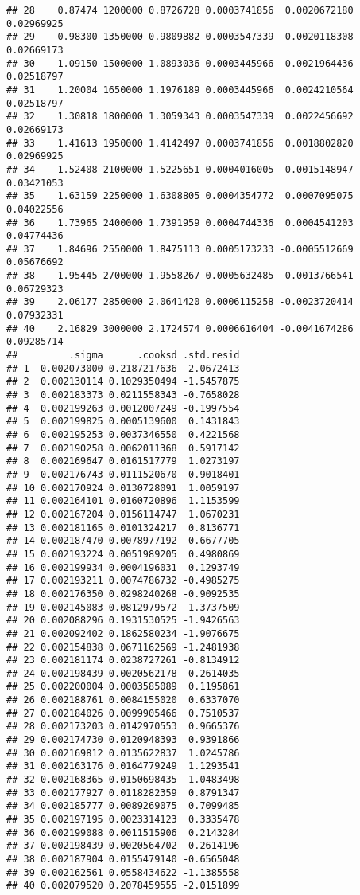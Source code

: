 \documentclass[]{book}
\theoremstyle{definition}
\theoremstyle{definition}
\theoremstyle{definition}
\theoremstyle{remark}
\begin{document}
\begin{verbatim}
## 28    0.87474 1200000 0.8726728 0.0003741856  0.0020672180 0.02969925
## 29    0.98300 1350000 0.9809882 0.0003547339  0.0020118308 0.02669173
## 30    1.09150 1500000 1.0893036 0.0003445966  0.0021964436 0.02518797
## 31    1.20004 1650000 1.1976189 0.0003445966  0.0024210564 0.02518797
## 32    1.30818 1800000 1.3059343 0.0003547339  0.0022456692 0.02669173
## 33    1.41613 1950000 1.4142497 0.0003741856  0.0018802820 0.02969925
## 34    1.52408 2100000 1.5225651 0.0004016005  0.0015148947 0.03421053
## 35    1.63159 2250000 1.6308805 0.0004354772  0.0007095075 0.04022556
## 36    1.73965 2400000 1.7391959 0.0004744336  0.0004541203 0.04774436
## 37    1.84696 2550000 1.8475113 0.0005173233 -0.0005512669 0.05676692
## 38    1.95445 2700000 1.9558267 0.0005632485 -0.0013766541 0.06729323
## 39    2.06177 2850000 2.0641420 0.0006115258 -0.0023720414 0.07932331
## 40    2.16829 3000000 2.1724574 0.0006616404 -0.0041674286 0.09285714
##         .sigma      .cooksd .std.resid
## 1  0.002073000 0.2187217636 -2.0672413
## 2  0.002130114 0.1029350494 -1.5457875
## 3  0.002183373 0.0211558343 -0.7658028
## 4  0.002199263 0.0012007249 -0.1997554
## 5  0.002199825 0.0005139600  0.1431843
## 6  0.002195253 0.0037346550  0.4221568
## 7  0.002190258 0.0062011368  0.5917142
## 8  0.002169647 0.0161517779  1.0273197
## 9  0.002176743 0.0111520670  0.9018401
## 10 0.002170924 0.0130728091  1.0059197
## 11 0.002164101 0.0160720896  1.1153599
## 12 0.002167204 0.0156114747  1.0670231
## 13 0.002181165 0.0101324217  0.8136771
## 14 0.002187470 0.0078977192  0.6677705
## 15 0.002193224 0.0051989205  0.4980869
## 16 0.002199934 0.0004196031  0.1293749
## 17 0.002193211 0.0074786732 -0.4985275
## 18 0.002176350 0.0298240268 -0.9092535
## 19 0.002145083 0.0812979572 -1.3737509
## 20 0.002088296 0.1931530525 -1.9426563
## 21 0.002092402 0.1862580234 -1.9076675
## 22 0.002154838 0.0671162569 -1.2481938
## 23 0.002181174 0.0238727261 -0.8134912
## 24 0.002198439 0.0020562178 -0.2614035
## 25 0.002200004 0.0003585089  0.1195861
## 26 0.002188761 0.0084155020  0.6337070
## 27 0.002184026 0.0099905466  0.7510537
## 28 0.002173203 0.0142970553  0.9665376
## 29 0.002174730 0.0120948393  0.9391866
## 30 0.002169812 0.0135622837  1.0245786
## 31 0.002163176 0.0164779249  1.1293541
## 32 0.002168365 0.0150698435  1.0483498
## 33 0.002177927 0.0118282359  0.8791347
## 34 0.002185777 0.0089269075  0.7099485
## 35 0.002197195 0.0023314123  0.3335478
## 36 0.002199088 0.0011515906  0.2143284
## 37 0.002198439 0.0020564702 -0.2614196
## 38 0.002187904 0.0155479140 -0.6565048
## 39 0.002162561 0.0558434622 -1.1385558
## 40 0.002079520 0.2078459555 -2.0151899
\end{verbatim}
\end{document}
